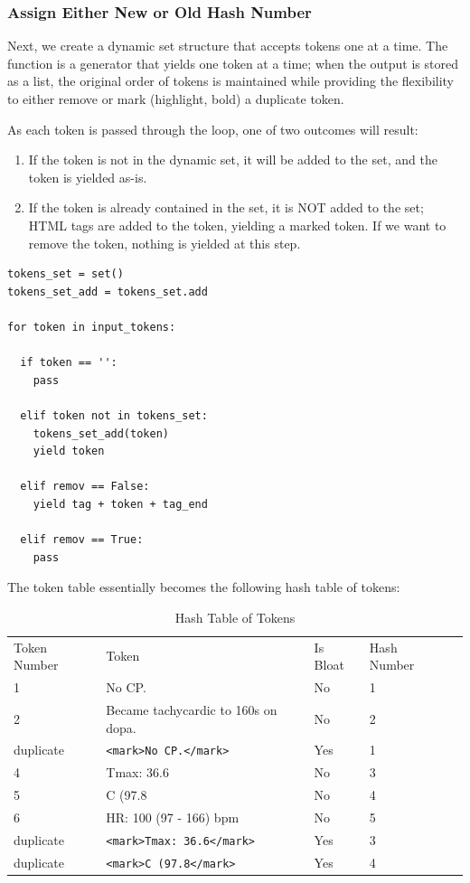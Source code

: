 \documentclass[runningheads,a4paper]{llncs}
\begin{document}
\subsubsection{Assign Either New or Old Hash Number}
Next, we create a dynamic set structure that accepts tokens one at a time. The function is a generator that yields one token at a time; when the output is stored as a list, the original order of tokens is maintained while providing the flexibility to either remove or mark (highlight, bold) a duplicate token.

\noindent As each token is passed through the loop, one of two outcomes will result:
\begin{enumerate}
\item
If the token is not in the dynamic set, it will be added to the set, and the token is yielded as-is.
\medskip

\item
If the token is already contained in the set, it is NOT added to the set; HTML tags are added to the token, yielding a marked token. If we want to remove the token, nothing is yielded at this step.
\end{enumerate}

\begin{lstlisting}[frame=single, style=customcode]
tokens_set = set()
tokens_set_add = tokens_set.add

for token in input_tokens:

  if token == '':
    pass

  elif token not in tokens_set:
    tokens_set_add(token)
    yield token

  elif remov == False:
    yield tag + token + tag_end

  elif remov == True:
    pass
\end{lstlisting}


\noindent The token table essentially becomes the following hash table of tokens:

\medskip\noindent%
\begin{table}
\caption{Hash Table of Tokens}
\begin{center}
\renewcommand{\arraystretch}{1.4}
\setlength\tabcolsep{3pt}
\begin{tabular}{lllll}
\hline\noalign{\smallskip}
Token Number & Token & Is Bloat & Hash Number\\
\noalign{\smallskip}
\hline
\noalign{\smallskip}
 1 & No CP. & No & 1\\
 2 & Became tachycardic to 160s on dopa. & No &2 \\
duplicate & \verb|<mark>No CP.</mark> | &Yes &1\\
4 & Tmax: 36.6 & No & 3\\
5 & C (97.8 & No & 4\\
6 & HR: 100 (97 - 166) bpm & No & 5\\
duplicate & \verb|<mark>Tmax: 36.6</mark>| & Yes & 3\\
duplicate & \verb|<mark>C (97.8</mark>| & Yes & 4\\
\hline
\end{tabular}
\end{center}
\end{table}
\end{document}
